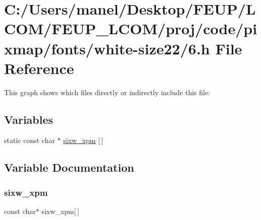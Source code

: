 \hypertarget{white-size22_26_8h}{}\section{C\+:/\+Users/manel/\+Desktop/\+F\+E\+U\+P/\+L\+C\+O\+M/\+F\+E\+U\+P\+\_\+\+L\+C\+O\+M/proj/code/pixmap/fonts/white-\/size22/6.h File Reference}
\label{white-size22_26_8h}
This graph shows which files directly or indirectly include this file\+:
\subsection*{Variables}
\begin{DoxyCompactItemize}
\item 
static const char $\ast$ \mbox{\hyperlink{white-size22_26_8h_afce922e6c0edcc6380a4f9dffc831326}{sixw\+\_\+xpm}} \mbox{[}$\,$\mbox{]}
\end{DoxyCompactItemize}


\subsection{Variable Documentation}
\mbox{\label{white-size22_26_8h_afce922e6c0edcc6380a4f9dffc831326}} 
\subsubsection{\texorpdfstring{sixw\_xpm}{sixw\_xpm}}
{\footnotesize\ttfamily const char$\ast$ sixw\+\_\+xpm\mbox{[}$\,$\mbox{]}\hspace{0.3cm}{\ttfamily [static]}}

